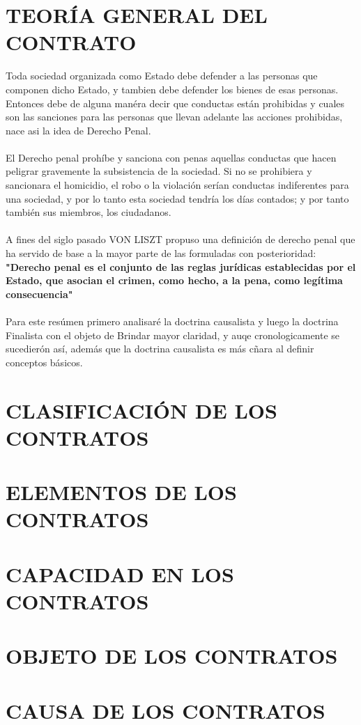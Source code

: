 \documentclass[12pt]{book}
\begin{document}
\chapter{TEORÍA GENERAL DEL CONTRATO}
Toda sociedad organizada como Estado debe defender a las personas que componen dicho Estado, y tambien debe 
defender los bienes de esas personas.\\
Entonces debe de alguna manéra decir que conductas están prohibidas y cuales son las sanciones para las personas que llevan adelante las acciones prohibidas, nace asi la idea de Derecho Penal.
\\ \\
El Derecho penal prohíbe y sanciona con penas aquellas conductas que hacen
peligrar gravemente la subsistencia de la sociedad. Si no se prohibiera y
sancionara el homicidio, el robo o la violación serían conductas indiferentes
para una sociedad, y por  lo tanto esta sociedad tendría los días contados; y por tanto también
sus miembros, los ciudadanos.
\\ \\
A fines del siglo pasado VON LISZT propuso una definición de
derecho penal que ha servido de base a la mayor parte de las formuladas con posterioridad:
\textbf{"Derecho penal es el conjunto de las reglas jurídicas establecidas por el Estado, que asocian el crimen, como hecho, a la pena,
como legítima consecuencia"} \\ \\
Para este resúmen primero analisaré la doctrina causalista y luego la doctrina Finalista con el objeto de
Brindar mayor claridad, y auqe cronologicamente se sucedierón así, además que la doctrina causalista es más cñara al definir conceptos básicos.
\chapter{CLASIFICACIÓN DE LOS CONTRATOS}
\chapter{ELEMENTOS DE LOS CONTRATOS}
\chapter{CAPACIDAD EN LOS CONTRATOS}
\chapter{OBJETO DE LOS CONTRATOS}
\chapter{CAUSA DE LOS CONTRATOS}
\end{document}
